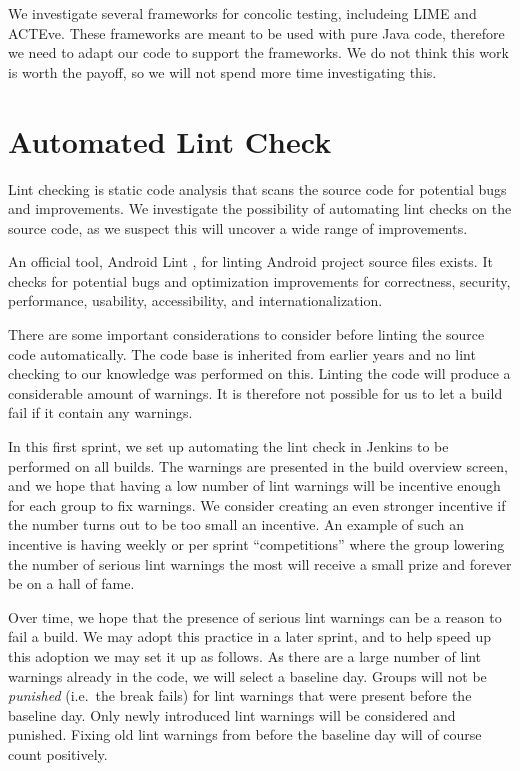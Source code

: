 We investigate several frameworks for concolic testing, includeing LIME and ACTEve. These frameworks are meant to be used with pure Java code, therefore we need to adapt our code to support the frameworks. We do not think this work is worth the payoff, so we will not spend more time investigating this.

\section{Automated Lint Check}\label{sec:automated_lint}
Lint checking is static code analysis that scans the source code for potential bugs and improvements. We investigate the possibility of automating lint checks on the source code, as we suspect this will uncover a wide range of improvements.

An official tool, Android Lint \parencite{AndroidLint}, for linting Android project source files exists. It checks for potential bugs and optimization improvements for correctness, security, performance, usability, accessibility, and internationalization.

There are some important considerations to consider before linting the source code automatically. The code base is inherited from earlier years and no lint checking to our knowledge was performed on this. Linting the code will produce a considerable amount of warnings. It is therefore not possible for us to let a build fail if it contain any warnings.

In this first sprint, we set up automating the lint check in Jenkins to be performed on all builds. The warnings are presented in the build overview screen, and we hope that having a low number of lint warnings will be incentive enough for each group to fix warnings. We consider creating an even stronger incentive if the number turns out to be too small an incentive. An example of such an incentive is having weekly or per sprint ``competitions'' where the group lowering the number of serious lint warnings the most will receive a small prize and forever be on a hall of fame.

Over time, we hope that the presence of serious lint warnings can be a reason to fail a build. We may adopt this practice in a later sprint, and to help speed up this adoption we may set it up as follows. As there are a large number of lint warnings already in the code, we will select a baseline day. Groups will not be \emph{punished} (i.e.\ the break fails) for lint warnings that were present before the baseline day. Only newly introduced lint warnings will be considered and punished. Fixing old lint warnings from before the baseline day will of course count positively. %

